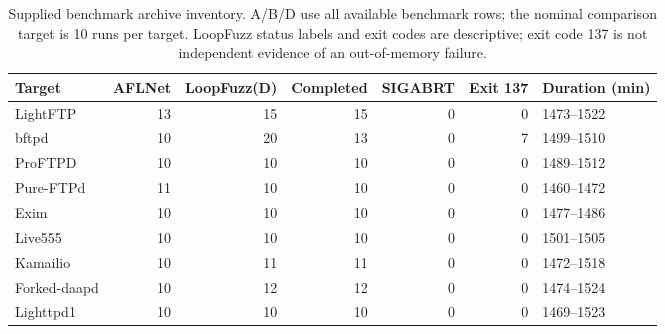 \begin{table}[t]
\centering\small
\caption{Supplied benchmark archive inventory. A/B/D use all available benchmark rows; the nominal comparison target is 10 runs per target. LoopFuzz status labels and exit codes are descriptive; exit code 137 is not independent evidence of an out-of-memory failure.}
\label{tab:observed_inventory}
\begin{tabular}{lrrrrrl}
\toprule
Target & AFLNet & LoopFuzz(D) & Completed & SIGABRT & Exit 137 & Duration (min) \\
\midrule
LightFTP & 13 & 15 & 15 & 0 & 0 & 1473--1522 \\
bftpd & 10 & 20 & 13 & 0 & 7 & 1499--1510 \\
ProFTPD & 10 & 10 & 10 & 0 & 0 & 1489--1512 \\
Pure-FTPd & 11 & 10 & 10 & 0 & 0 & 1460--1472 \\
Exim & 10 & 10 & 10 & 0 & 0 & 1477--1486 \\
Live555 & 10 & 10 & 10 & 0 & 0 & 1501--1505 \\
Kamailio & 10 & 11 & 11 & 0 & 0 & 1472--1518 \\
Forked-daapd & 10 & 12 & 12 & 0 & 0 & 1474--1524 \\
Lighttpd1 & 10 & 10 & 10 & 0 & 0 & 1469--1523 \\
\bottomrule
\end{tabular}
\end{table}
